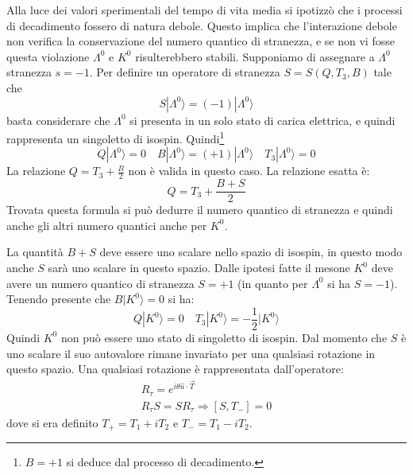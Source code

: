 Alla luce dei valori sperimentali del tempo di vita media si ipotizzò che i
processi di decadimento fossero di natura debole.
Questo implica che l'interazione debole non verifica la conservazione del numero
quantico di stranezza, e se non vi fosse questa violazione $\Lambda^0$ e $K^0$
risulterebbero stabili.
Supponiamo di assegnare a $\Lambda^0$ stranezza $s=-1$.
Per definire un operatore di stranezza $S=S(Q,T_3,B)$ tale che
\[
S|\Lambda^0\rangle =(-1)|\Lambda^0\rangle
\]
basta considerare che $\Lambda^0$ si presenta in un solo stato di carica
elettrica, e quindi rappresenta un singoletto di isospin. Quindi\footnote{$B=+1$
si deduce dal processo di decadimento.}
\[
Q|\Lambda^0\rangle =0 \quad B|\Lambda^0\rangle =(+1)|\Lambda^0\rangle \quad 
T_3|\Lambda^0\rangle =0
\]
La relazione $Q=T_3+\frac{B}{2}$ non è valida in questo caso. La relazione 
esatta è:
\[
Q=T_3+\frac{B+S}{2}
\]
Trovata questa formula si può dedurre il numero quantico di stranezza e quindi 
anche gli altri numero quantici anche per $K^0$.

 La quantità $B+S$ deve essere uno scalare nello spazio 
di isospin, in questo modo anche
$S$ sarà uno scalare in questo spazio.
Dalle ipotesi fatte il mesone $K^0$ deve avere un numero quantico di stranezza 
$S=+1$ (in quanto per $\Lambda^0$ si ha $S=-1$).
Tenendo presente che $B|K^0\rangle =0$ si ha:
\begin{equation}
Q|K^0\rangle =0\quad T_3|K^0\rangle =-\frac{1}{2}|K^0\rangle
\end{equation}
Quindi $K^0$ non può essere uno stato di singoletto di isospin.
Dal momento che $S$ è uno scalare il suo autovalore rimane invariato per una 
qualsiasi rotazione in questo spazio.
Una qualsiasi rotazione è rappresentata dall'operatore:
\begin{gather}
R_{\tau}=e^{i\theta \hat{u}\cdot\vec{T}}\\
R_{\tau}S=SR_{\tau}\Rightarrow [S,T_-]=0
\end{gather}
dove si era definito $T_+=T_1+iT_2$ e $T_-=T_1-iT_2$.


